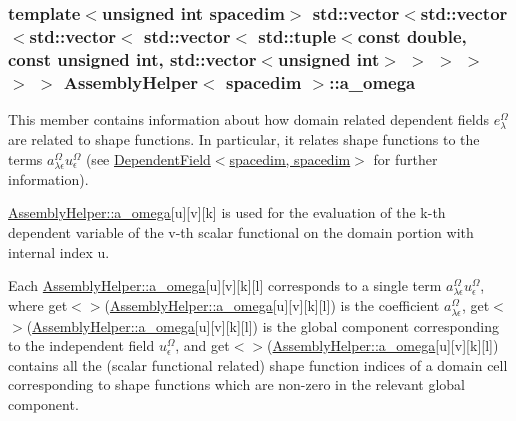 \subsubsection[{\texorpdfstring{a\+\_\+omega}{a_omega}}]{\setlength{\rightskip}{0pt plus 5cm}template$<$unsigned int spacedim$>$ std\+::vector$<$std\+::vector$<$std\+::vector$<$ std\+::vector$<$ std\+::tuple$<$const double, const unsigned int, std\+::vector$<$unsigned int$>$ $>$ $>$ $>$ $>$ $>$ {\bf Assembly\+Helper}$<$ spacedim $>$\+::a\+\_\+omega\hspace{0.3cm}{\ttfamily [private]}}\hypertarget{class_assembly_helper_a13fef9096e5fc7b1e922ea78d7aa2c28}{}\label{class_assembly_helper_a13fef9096e5fc7b1e922ea78d7aa2c28}
This member contains information about how domain related dependent fields $e^\Omega_\lambda$ are related to shape functions. In particular, it relates shape functions to the terms $a^\Omega_{\lambda\epsilon} u^\Omega_\epsilon$ (see \hyperlink{class_dependent_field_3_01spacedim_00_01spacedim_01_4}{Dependent\+Field$<$spacedim, spacedim$>$} for further information).

\hyperlink{class_assembly_helper_a13fef9096e5fc7b1e922ea78d7aa2c28}{Assembly\+Helper\+::a\+\_\+omega}\mbox{[}{\ttfamily u}\mbox{]}\mbox{[}{\ttfamily v}\mbox{]}\mbox{[}{\ttfamily k}\mbox{]} is used for the evaluation of the {\ttfamily k-\/th} dependent variable of the {\ttfamily v-\/th} scalar functional on the domain portion with internal index {\ttfamily u}.

Each \hyperlink{class_assembly_helper_a13fef9096e5fc7b1e922ea78d7aa2c28}{Assembly\+Helper\+::a\+\_\+omega}\mbox{[}{\ttfamily u}\mbox{]}\mbox{[}{\ttfamily v}\mbox{]}\mbox{[}{\ttfamily k}\mbox{]}\mbox{[}{\ttfamily l}\mbox{]} corresponds to a single term $a^\Omega_{\lambda \epsilon} u^\Omega_\epsilon$, where {\ttfamily get$<${$>$}(\hyperlink{class_assembly_helper_a13fef9096e5fc7b1e922ea78d7aa2c28}{Assembly\+Helper\+::a\+\_\+omega}}\mbox{[}{\ttfamily u}\mbox{]}\mbox{[}{\ttfamily v}\mbox{]}\mbox{[}{\ttfamily k}\mbox{]}\mbox{[}{\ttfamily l}\mbox{]}) is the coefficient $a^\Omega_{\lambda \epsilon}$, {\ttfamily get$<${$>$}(\hyperlink{class_assembly_helper_a13fef9096e5fc7b1e922ea78d7aa2c28}{Assembly\+Helper\+::a\+\_\+omega}}\mbox{[}{\ttfamily u}\mbox{]}\mbox{[}{\ttfamily v}\mbox{]}\mbox{[}{\ttfamily k}\mbox{]}\mbox{[}{\ttfamily l}\mbox{]}) is the global component corresponding to the independent field $u^\Omega_\epsilon$, and {\ttfamily get$<${$>$}(\hyperlink{class_assembly_helper_a13fef9096e5fc7b1e922ea78d7aa2c28}{Assembly\+Helper\+::a\+\_\+omega}}\mbox{[}{\ttfamily u}\mbox{]}\mbox{[}{\ttfamily v}\mbox{]}\mbox{[}{\ttfamily k}\mbox{]}\mbox{[}{\ttfamily l}\mbox{]}) contains all the (scalar functional related) shape function indices of a domain cell corresponding to shape functions which are non-\/zero in the relevant global component. 
